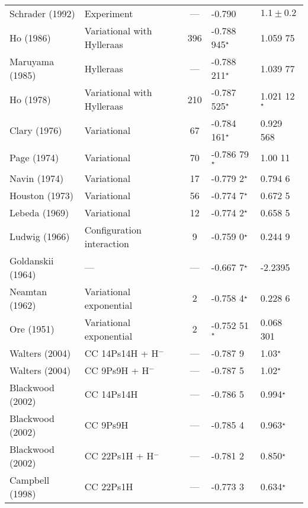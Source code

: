 \documentclass[Dissertation.tex]{subfiles}
\begin{document}
{\begin{center}
\begin{longtable}{l l c l l}
Schrader (1992) \cite{Schrader1992} & Experiment & --- & -0.790 & $1.1 \pm 0.2$ \\*
Ho (1986) \cite{Ho1986} & Variational with Hylleraas & 396 & -0.788 945$^\star$ & 1.059 75 \\*
Maruyama (1985) \cite{Maruyama1985,Saito2003a} & Hylleraas & --- & -0.788 211$^\star$ & 1.039 77 \\*
Ho (1978) \cite{Ho1978} & Variational with Hylleraas & 210 & -0.787 525$^\star$ & 1.021 12$^\star$ \\*
Clary (1976) \cite{Clary1976} & Variational & 67 & -0.784 161$^\star$ & 0.929 568 \\*
Page (1974) \cite{Page1974} & Variational & 70 & -0.786 79$^\star$ & 1.00 11 \\*
Navin (1974) \cite{Navin1974} & Variational & 17 & -0.779 2$^\star$ & 0.794 6 \\*
Houston (1973) \cite{Houston1973} & Variational & 56 & -0.774 7$^\star$ & 0.672 5 \\*
Lebeda (1969) \cite{Lebeda1969} & Variational & 12 & -0.774 2$^\star$ & 0.658 5 \\*
Ludwig (1966) \cite{Ludwig1966} & Configuration interaction & 9 & -0.759 0$^\star$ & 0.244 9 \\*
Goldanskii (1964) \cite{Goldanskii1964,Clary1976} & --- & --- & -0.667 7$^\star$ & -2.2395 \\*
Neamtan (1962) \cite{Neamtan1962} & Variational exponential & 2 & -0.758 4$^\star$ & 0.228 6 \\*
Ore (1951) \cite{Ore1951} & Variational exponential & 2 & -0.752 51$^\star$ & 0.068 301 \\*
Walters (2004) \cite{Walters2004} & CC 14Ps14H + H$^-$ & --- & -0.787 9 & 1.03$^\star$\\*
Walters (2004) \cite{Walters2004} & CC 9Ps9H + H$^-$ & --- & -0.787 5 & 1.02$^\star$\\*
Blackwood (2002) \cite{Blackwood2002} & CC 14Ps14H & --- & -0.786 5  & 0.994$^\star$ \\*
Blackwood (2002) \cite{Blackwood2002} & CC 9Ps9H & --- & -0.785 4 & 0.963$^\star$ \\*
Blackwood (2002) \cite{Blackwood2002b} & CC 22Ps1H + H$^-$ & --- & -0.781 2 & 0.850$^\star$ \\*
Campbell (1998) \cite{Campbell1998} & CC 22Ps1H & --- & -0.773 3 & 0.634$^\star$ \\*
\bottomrule
\end{longtable}
\end{center}

}
\end{document}
